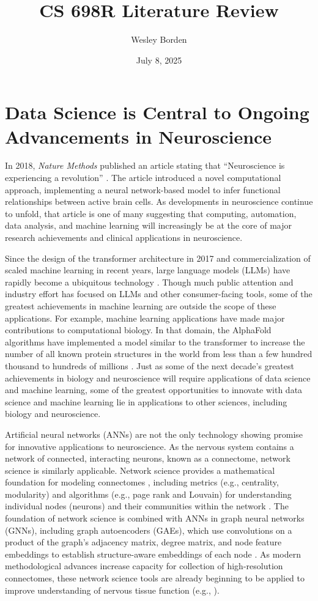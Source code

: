 \documentclass[11pt]{article}
\title{CS 698R Literature Review}
\author{Wesley Borden}
\date{July 8, 2025}
\newcommand{\sectionwithindent}[1]{
    \section*{#1}
    \hspace{\parindent} %
}
\begin{document}
\sectionwithindent{Data Science is Central to Ongoing Advancements in Neuroscience}
In 2018, \textit{Nature Methods} published an article stating that ``Neuroscience is experiencing a revolution'' \cite{pandarinath2018autoencoders}. The article introduced a novel computational approach, implementing a neural network-based model to infer functional relationships between active brain cells. As developments in neuroscience continue to unfold, that article is one of many suggesting that computing, automation, data analysis, and machine learning will increasingly be at the core of major research achievements and clinical applications in neuroscience.

Since the design of the transformer architecture in 2017 \cite{vaswani2023attentionneed} and commercialization of scaled machine learning in recent years, large language models (LLMs) have rapidly become a ubiquitous technology \cite{naveed2025llm}. Though much public attention and industry effort has focused on LLMs and other consumer-facing tools, some of the greatest achievements in machine learning are outside the scope of these applications. For example, machine learning applications have made major contributions to computational biology. In that domain, the AlphaFold algorithms have implemented a model similar to the transformer to increase the number of all known protein structures in the world from less than a few hundred thousand to hundreds of millions \cite{jumper2021alphafold, varadi2024alphafolddb}. Just as some of the next decade's greatest achievements in biology and neuroscience will require applications of data science and machine learning, some of the greatest opportunities to innovate with data science and machine learning lie in applications to other sciences, including biology and neuroscience.

Artificial neural networks (ANNs) are not the only technology showing promise for innovative applications to neuroscience. As the nervous system contains a network of connected, interacting neurons, known as a connectome, network science is similarly applicable. Network science provides a mathematical foundation for modeling connectomes \cite{emmons2015connectomics, easley2010networks, newman2010networks}, including metrics (e.g., centrality, modularity) and algorithms (e.g., page rank and Louvain) for understanding individual nodes (neurons) and their communities within the network \cite{easley2010networks, newman2010networks}. The foundation of network science is combined with ANNs in graph neural networks (GNNs), including graph autoencoders (GAEs), which use convolutions on a product of the graph's adjacency matrix, degree matrix, and node feature embeddings to establish structure-aware embeddings of each node \cite{velickovic2018graphattentionnetworks, kipf2016gae}. As modern methodological advances increase capacity for collection of high-resolution connectomes, these network science tools are already beginning to be applied to improve understanding of nervous tissue function (e.g., \cite{srinivasan2025gnnconnectome, neudorf2022gnnconnectome}).
\end{document}
